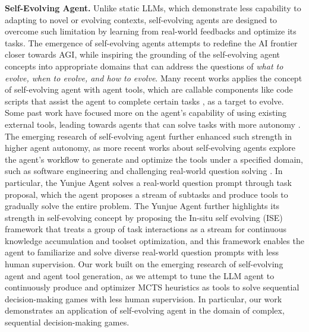 \documentclass{article}
\begin{document}
\textbf{Self-Evolving Agent.}
Unlike static LLMs, which demonstrate less capability to adapting to novel or evolving contexts, self-evolving agents are designed to overcome such limitation by learning from real-world feedbacks and optimize its tasks\cite{Part3SEA}. The emergence of self-evolving agents attempts to redefine the AI frontier closer towards AGI\cite{Part3ToolYunjue}, while inspiring the grounding of the self-evolving agent concepts into appropriate domains that can address the questions of \textit{what to evolve, when to evolve, and how to evolve}\cite{Part3SEA}. Many recent works applies the concept of self-evolving agent with agent tools, which are callable components like code scripts that assist the agent to complete certain tasks \cite{Part3ReAct}\cite{Part3ToolYunjue}, as a target to evolve. Some past work have focused more on the agent's capability of using existing external tools\cite{Part3ReAct}, leading towards agents that can solve tasks with more autonomy \cite{Part3DPAgent}. The emerging research of self-evolving agent further enhanced such strength in higher agent autonomy, as more recent works about self-evolving agents explore the agent's workflow to generate and optimize the tools under a specified domain, such as software engineering \cite{Part3LiveSWE} and challenging real-world question solving \cite{Part3ToolYunjue}. In particular, the Yunjue Agent solves a real-world question prompt through task proposal, which the agent proposes a stream of subtasks and produce tools to gradually solve the entire problem\cite{Part3ToolYunjue}. The Yunjue Agent further highlights its strength in self-evolving concept by proposing the In-situ self evolving (ISE) framework that treats a group of task interactions as a stream for continuous knowledge accumulation and toolset optimization\cite{Part3ToolYunjue}, and this framework enables the agent to familiarize and solve diverse real-world question prompts with less human supervision. Our work built on the emerging research of self-evolving agent and agent tool generation, as we attempt to tune the LLM agent to continuously produce and optimizer MCTS heuristics as tools to solve sequential decision-making games with less human supervision. In particular, our work demonstrates an application of self-evolving agent in the domain of complex, sequential decision-making games. 
\end{document}
